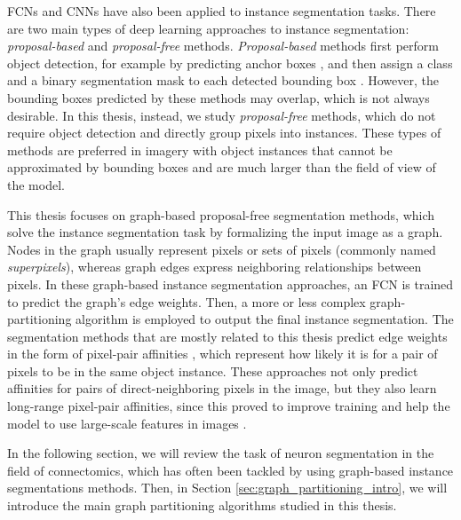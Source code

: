FCNs and CNNs have also been applied to instance segmentation tasks.
There are two main types of deep learning approaches to instance segmentation: \emph{proposal-based} and \emph{proposal-free} methods. 
\emph{Proposal-based} methods first perform object detection, for example by predicting anchor boxes \cite{ren2015faster}, and then assign a class and a binary segmentation mask to each detected bounding box \cite{he2017mask,porzi2019seamless}.
However, the bounding boxes predicted by these methods may overlap, which is not always desirable. 
In this thesis, instead, we study \emph{proposal-free} methods, which do not require object detection and directly group pixels into instances. 
These types of methods are preferred in imagery with object instances that cannot be approximated by bounding boxes and are much larger than the field of view of the model. 

This thesis focuses on graph-based proposal-free segmentation methods, which solve the instance segmentation task by formalizing the input image as a graph. Nodes in the graph usually represent pixels or sets of pixels (commonly named \emph{superpixels}), whereas graph edges express neighboring relationships between pixels. In these graph-based instance segmentation approaches, an FCN is trained to predict the graph's edge weights. Then, a more or less complex graph-partitioning algorithm is employed to output the final instance segmentation. 
The segmentation methods that are mostly related to this thesis predict edge weights in the form of pixel-pair affinities \cite{Gao_2019_ICCV,liu2018affinity,lee2017superhuman}, which represent how likely it is for a pair of pixels to be in the same object instance. These approaches not only predict affinities for pairs of direct-neighboring pixels in the image, but they also learn long-range pixel-pair affinities, since this proved to improve training and help the model to use large-scale features in images \cite{lee2017superhuman}.

In the following section, we will review the task of neuron segmentation in the field of connectomics, which has often been tackled by using graph-based instance segmentations methods. Then, in Section \ref{sec:graph_partitioning_intro}, we will introduce the main graph partitioning algorithms studied in this thesis.

